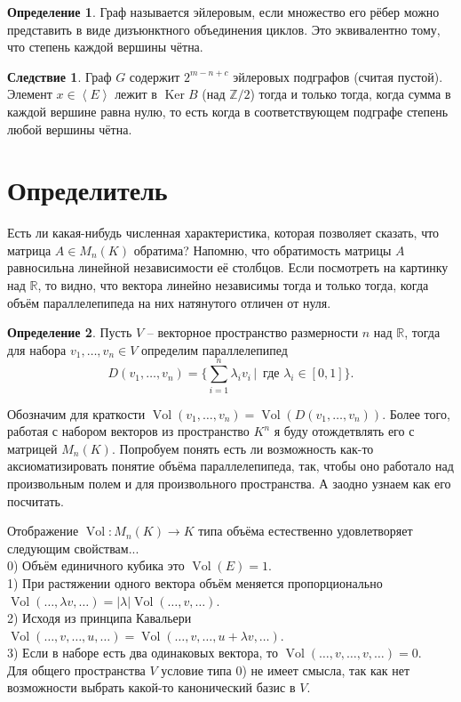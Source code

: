\documentclass[10pt,a4paper,oneside]{book} %
\theoremstyle{definition}
\newtheorem*{defn}{Определение}
\newtheorem{cor}{Следствие}
\newcommand{\mb}[1]{\mathbb{#1}}
\newcommand{\Vol}{\operatorname{Vol}}
\DeclareMathOperator{\Ker}{Ker}
\def\lan{\left\langle }
\def\ran{\right\rangle}
\def\dfn{\begin{defn}}
\def\edfn{\end{defn}}
\def\crl{\begin{cor}}
\def\ecrl{\end{cor}}
\begin{document}
\dfn Граф называется эйлеровым, если множество его рёбер можно представить в виде дизъюнктного объединения циклов. Это эквивалентно тому, что степень каждой вершины чётна.
\edfn

\crl Граф $G$ содержит $2^{m-n+c}$ эйлеровых подграфов (считая пустой).
\proof Элемент $x \in \lan E \ran $ лежит в $\Ker B$ (над $\mb Z/2$) тогда и только тогда, когда сумма в каждой вершине равна нулю, то есть когда в соответствующем подграфе степень любой вершины чётна.
\endproof
\ecrl


\section{Определитель}

Есть ли какая-нибудь численная характеристика, которая позволяет сказать, что матрица $A\in M_n(K)$ обратима? Напомню, что обратимость матрицы $A$ равносильна линейной независимости её столбцов. Если посмотреть на картинку над $\mb R$, то видно, что вектора линейно независимы тогда и только тогда, когда объём параллелепипеда на них натянутого отличен от нуля.

\dfn Пусть $V$ -- векторное пространство размерности $n$ над $\mb R$, тогда для набора  $v_1,\dots,v_n \in V$ определим параллелепипед 
$$D(v_1,\dots,v_n)=\{\sum_{i=1}^n \lambda_i v_i\,|\, \text{ где } \lambda_i\in [0,1]\}.$$
\edfn

Обозначим для краткости $\Vol(v_1,\dots,v_n)= \Vol (D(v_1,\dots,v_n))$. Более того, работая с набором векторов из пространство $K^n$ я буду отождетвлять его с матрицей $M_n(K)$. 
Попробуем понять есть ли возможность как-то аксиоматизировать понятие объёма параллелепипеда, так, чтобы оно работало над произвольным полем и для произвольного пространства. А заодно узнаем как его посчитать.

Отображение $\Vol \colon M_n(K) \to K$ типа объёма естественно удовлетворяет следующим свойствам...\\
0) Объём единичного кубика это $\Vol(E)=1$.\\
1) При растяжении одного вектора объём меняется пропорционально $\Vol(\dots,\lambda v,\dots)=|\lambda|\Vol(\dots,v,\dots)$.\\
2) Исходя из принципа Кавальери $\Vol(\dots,v,\dots,u,\dots)=\Vol(\dots,v,\dots,u+\lambda v,\dots)$.\\
3) Если в наборе есть два одинаковых вектора, то $\Vol(\dots,v, \dots, v,\dots)=0$.\\

Для общего пространства $V$ условие типа 0) не имеет смысла, так как нет возможности выбрать какой-то канонический базис в $V$.
\end{document}

